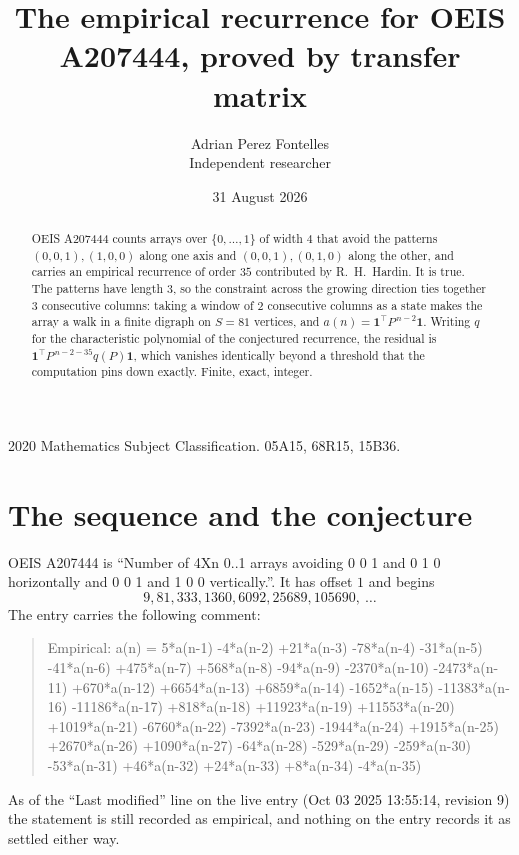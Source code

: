 \documentclass[11pt,a4paper]{article}
\title{The empirical recurrence for OEIS A207444, proved by transfer matrix}
\author{Adrian Perez Fontelles\\ \small Independent researcher}
\date{31 August 2026}
\theoremstyle{plain}
\theoremstyle{definition}
\begin{document}
\maketitle

\begin{abstract}
OEIS A207444 counts arrays over $\{0,\dots,1\}$ of width $4$ that avoid the patterns
$(0,0,1), (1,0,0)$ along one axis and $(0,0,1), (0,1,0)$ along the other, and carries an empirical recurrence of
order $35$ contributed by R.~H.~Hardin. It is true. The patterns have length $3$, so
the constraint across the growing direction ties together $3$ consecutive columns: taking a
window of $2$ consecutive columns as a state makes the array a walk in a finite digraph
on $S=81$ vertices, and $a(n)=\mathbf{1}^{\!\top}P^{\,n-2}\mathbf{1}$. Writing $q$
for the characteristic polynomial of the conjectured recurrence, the residual is
$\mathbf{1}^{\!\top}P^{\,n-2-35}q(P)\mathbf{1}$, which vanishes identically
beyond a threshold that the computation pins down exactly. Finite, exact, integer.
\end{abstract}

\noindent\small 2020 Mathematics Subject Classification. 05A15, 68R15, 15B36.\normalsize

\section{The sequence and the conjecture}

OEIS A207444 is ``Number of 4Xn 0..1 arrays avoiding 0 0 1 and 0 1 0 horizontally and 0 0 1 and 1 0 0 vertically.''. It has offset
$1$ and begins
\[
9, 81, 333, 1360, 6092, 25689, 105690,\ \dots
\]
The entry carries the following comment:
\begin{quote}\small
Empirical: a(n) = 5*a(n-1) -4*a(n-2) +21*a(n-3) -78*a(n-4) -31*a(n-5) -41*a(n-6) +475*a(n-7) +568*a(n-8) -94*a(n-9) -2370*a(n-10) -2473*a(n-11) +670*a(n-12) +6654*a(n-13) +6859*a(n-14) -1652*a(n-15) -11383*a(n-16) -11186*a(n-17) +818*a(n-18) +11923*a(n-19) +11553*a(n-20) +1019*a(n-21) -6760*a(n-22) -7392*a(n-23) -1944*a(n-24) +1915*a(n-25) +2670*a(n-26) +1090*a(n-27) -64*a(n-28) -529*a(n-29) -259*a(n-30) -53*a(n-31) +46*a(n-32) +24*a(n-33) +8*a(n-34) -4*a(n-35)
\end{quote}
As of the ``Last modified'' line on the live entry (Oct 03 2025 13:55:14, revision
9) the statement is still recorded as empirical, and nothing on the entry
records it as settled either way.
\end{document}
